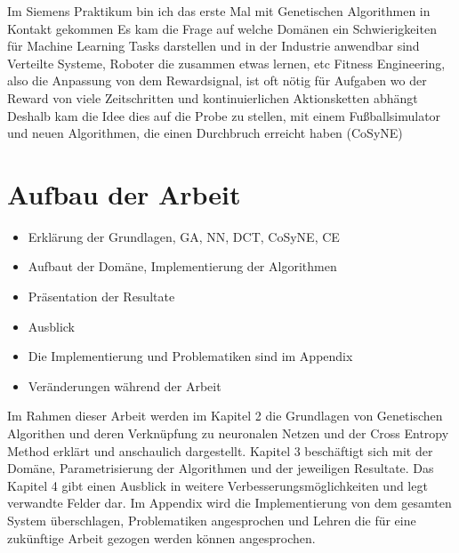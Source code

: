 Im Siemens Praktikum bin ich das erste Mal mit Genetischen Algorithmen in Kontakt gekommen
Es kam die Frage auf welche Domänen ein Schwierigkeiten für Machine Learning Tasks darstellen und in der Industrie anwendbar sind
Verteilte Systeme, Roboter die zusammen etwas lernen, etc
Fitness Engineering, also die Anpassung von dem Rewardsignal, ist oft nötig für Aufgaben wo der Reward von viele Zeitschritten und kontinuierlichen Aktionsketten abhängt
Deshalb kam die Idee dies auf die Probe zu stellen, mit einem Fußballsimulator und neuen Algorithmen, die einen Durchbruch erreicht haben (CoSyNE)

\section{Aufbau der Arbeit}
\begin{itemize}
    \item Erklärung der Grundlagen, GA, NN, DCT, CoSyNE, CE
    \item Aufbaut der Domäne, Implementierung der Algorithmen
    \item Präsentation der Resultate
    \item Ausblick
    \item Die Implementierung und Problematiken sind im Appendix
    \item Veränderungen während der Arbeit
\end{itemize}


Im Rahmen dieser Arbeit werden im Kapitel 2 die Grundlagen von Genetischen Algorithen und deren Verknüpfung zu neuronalen Netzen und der Cross Entropy Method erklärt und anschaulich dargestellt. Kapitel 3 beschäftigt sich mit der Domäne, Parametrisierung der Algorithmen und der jeweiligen Resultate. Das Kapitel 4 gibt einen Ausblick in weitere Verbesserungsmöglichkeiten und legt verwandte Felder dar. Im Appendix wird die Implementierung von dem gesamten System überschlagen, Problematiken angesprochen und Lehren die für eine zukünftige Arbeit gezogen werden können angesprochen.